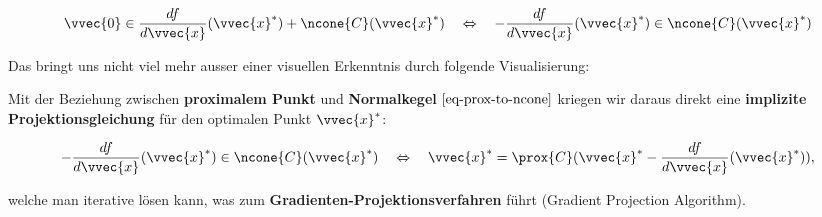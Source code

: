 \documentclass[
  12pt,
  a4paper,
  twoside,
  titlepage,
  openright,
  numbers=noenddot,
  chapterprefix=true,
  headings=optiontohead,
  svgnames,
  dvipsnames]{scrreprt}
\begin{document}
\[\begin{align}
\vvec{0} \in \frac{df}{d\vvec{x}}(\vvec{x}^*) + \ncone{C}(\vvec{x}^*) \quad \Leftrightarrow \quad -\frac{df}{d\vvec{x}}(\vvec{x}^*) \in \ncone{C}(\vvec{x}^*)
\label{eq-optimality-strict-convex-2}
\end{align}\]

Das bringt uns nicht viel mehr ausser einer visuellen Erkenntnis durch
folgende Visualisierung:


Mit der Beziehung zwischen \textbf{proximalem Punkt} und
\textbf{Normalkegel} \(\eqref{eq-prox-to-ncone}\) kriegen wir daraus
direkt eine \textbf{implizite Projektionsgleichung} für den optimalen
Punkt \(\vvec{x}^*\):

\[\begin{align}
-\frac{df}{d\vvec{x}}(\vvec{x}^*) \in \ncone{C}(\vvec{x}^*) \quad \Leftrightarrow \quad \vvec{x}^* = \prox{C}(\vvec{x}^* - \frac{df}{d\vvec{x}}(\vvec{x}^*)),
\end{align}\]

welche man iterative lösen kann, was zum
\textbf{Gradienten-Projektionsverfahren} führt (Gradient Projection
Algorithm).

\printbibliography
\end{document}

